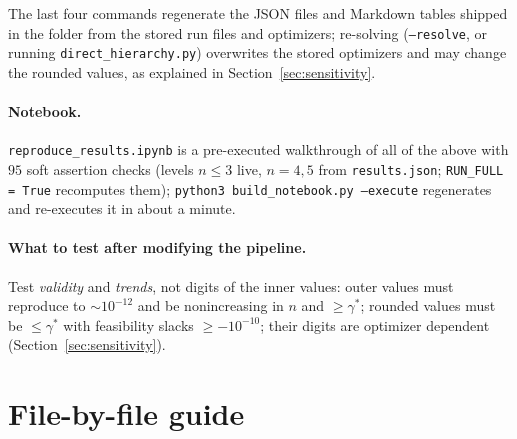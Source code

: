 \documentclass[11pt,a4paper]{article}
\newcommand*{\code}[1]{\texttt{#1}}
\theoremstyle{remark}
\begin{document}
\noindent The last four commands regenerate the JSON files and Markdown
tables shipped in the folder from the stored run files and optimizers;
re-solving (\code{--resolve}, or running \code{direct\_hierarchy.py})
overwrites the stored optimizers and may change the rounded values, as
explained in Section~\ref{sec:sensitivity}.

\paragraph{Notebook.}
\code{reproduce\_results.ipynb} is a pre-executed walkthrough of all of the
above with $95$ soft assertion checks (levels $n\leq 3$ live, $n=4,5$ from
\code{results.json}; \code{RUN\_FULL = True} recomputes them);
\code{python3 build\_notebook.py --execute} regenerates and re-executes it
in about a minute.

\paragraph{What to test after modifying the pipeline.}
Test \emph{validity} and \emph{trends}, not digits of the inner values:
outer values must reproduce to $\sim 10^{-12}$ and be nonincreasing in
$n$ and $\geq\gamma^*$; rounded values must be $\leq\gamma^*$ with
feasibility slacks $\geq -10^{-10}$; their digits are optimizer dependent
(Section~\ref{sec:sensitivity}).

\section{File-by-file guide}\label{sec:files}
\end{document}
